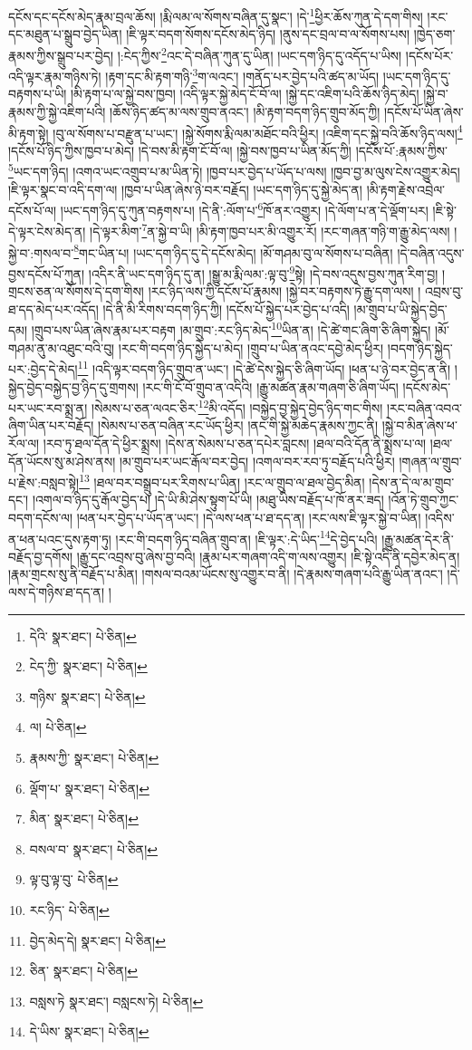 དངོས་དང་དངོས་མེད་རྣམ་བྲལ་ཆོས། །རྨི་ལམ་ལ་སོགས་བཞིན་དུ་སྣང་། །དེ་\footnote{དེའི་  སྣར་ཐང་།  པེ་ཅིན། }ཕྱིར་ཆོས་ཀུན་དེ་དག་གིས། །རང་དང་མཐུན་པ་སྒྲུབ་བྱེད་ཡིན། །ཇི་ལྟར་བདག་སོགས་དངོས་མེད་ཉིད། །ནུས་དང་བྲལ་བ་ལ་སོགས་པས། །ཁྱེད་ཅག་རྣམས་ཀྱིས་སྒྲུབ་པར་བྱེད། །:ངེད་ཀྱིས་\footnote{ངེད་ཀྱི་  སྣར་ཐང་།  པེ་ཅིན། }འང་དེ་བཞིན་ཀུན་དུ་ཡིན། །ཡང་དག་ཉིད་དུ་འདོད་པ་ཡིས། །དངོས་པོར་འདི་ལྟར་རྣམ་གཉིས་ཏེ། །རྟག་དང་མི་རྟག་གཉི་\footnote{གཉིས་  སྣར་ཐང་།  པེ་ཅིན། }ག་ལའང་། །གནོད་པར་བྱེད་པའི་ཚད་མ་ཡོད། །ཡང་དག་ཉིད་དུ་བརྟགས་པ་ཡི། །མི་རྟག་པ་ལ་སྐྱེ་བས་ཁྱབ། །འདི་ལྟར་སྐྱེ་མེད་ངོ་བོ་ལ། །སྐྱེ་དང་འཇིག་པའི་ཆོས་ཉིད་མེད། །སྐྱེ་བ་རྣམས་ཀྱི་སྐྱེ་འཇིག་པའི། །ཆོས་ཉིད་ཚད་མ་ལས་གྲུབ་ནའང་། །མི་རྟག་བདག་ཉིད་གྲུབ་མོད་ཀྱི། །དངོས་པོ་ཡིན་ཞེས་མི་རྟག་སྟེ། །བུ་ལ་སོགས་པ་བརྫུན་པ་ཡང་། །སྐྱེ་སོགས་རྨི་ལམ་མཐོང་བའི་ཕྱིར། །འཇིག་དང་སྐྱེ་བའི་ཆོས་ཉིད་ལས།\footnote{ལ།  པེ་ཅིན། } །དངོས་པོ་ཉིད་ཀྱིས་ཁྱབ་པ་མེད། །དེ་བས་མི་རྟག་ངོ་བོ་ལ། །སྐྱེ་བས་ཁྱབ་པ་ཡིན་མོད་ཀྱི། །དངོས་པོ་:རྣམས་ཀྱིས་\footnote{རྣམས་ཀྱི་  སྣར་ཐང་།  པེ་ཅིན། }ཡང་དག་ཉིད། །འགའ་ཡང་འགྲུབ་པ་མ་ཡིན་ཏེ། །ཁྱབ་པར་བྱེད་པ་ཡོད་པ་ལས། །ཁྱབ་བྱ་མ་ལུས་ངེས་འགྱུར་མེད། །ཇི་ལྟར་སྣང་བ་འདི་དག་ལ། །ཁྱབ་པ་ཡིན་ཞེས་ཉེ་བར་བརྗོད། །ཡང་དག་ཉིད་དུ་སྐྱེ་མེད་ན། །མི་རྟག་རྗེས་འབྲེལ་དངོས་པོ་ལ། །ཡང་དག་ཉིད་དུ་ཀུན་བརྟགས་པ། །དེ་ནི་:ལོག་པ་\footnote{ལྡོག་པ་  སྣར་ཐང་།  པེ་ཅིན། }ཁོ་ནར་འགྱུར། །དེ་ལོག་པ་ན་དེ་ལྡོག་པར། །ཇི་སྟེ་དེ་ལྟར་ངེས་མེད་ན། །དེ་ལྟར་མིག་\footnote{མིན་  སྣར་ཐང་།  པེ་ཅིན། }ན་སྐྱེ་བ་ཡི། །མི་རྟག་ཁྱབ་པར་མི་འགྱུར་རོ། །རང་གཞན་གཉི་ག་རྒྱུ་མེད་ལས། །སྐྱེ་བ་:གསལ་བ་\footnote{བསལ་བ་  སྣར་ཐང་།  པེ་ཅིན། }གང་ཡིན་པ། །ཡང་དག་ཉིད་དུ་དེ་དངོས་མེད། །མོ་གཤམ་བུ་ལ་སོགས་པ་བཞིན། །དེ་བཞིན་འདུས་བྱས་དངོས་པོ་ཀུན། །འདིར་ནི་ཡང་དག་ཉིད་དུ་ན། །སྒྱུ་མ་རྨི་ལམ་:ལྟ་བུ་\footnote{ལྟ་བུ་ལྟ་བུ་  པེ་ཅིན། }སྟེ། །དེ་བས་འདུས་བྱས་ཀུན་རིག་བྱ། །གྲངས་ཅན་ལ་སོགས་དེ་དག་གིས། །རང་ཉིད་ལས་ཀྱི་དངོས་པོ་རྣམས། །སྐྱེ་བར་བརྟགས་ཏེ་རྒྱུ་དག་ལས། །
འབྲས་བུ་ཐ་དད་མེད་པར་འདོད། །དེ་ནི་མི་རིགས་བདག་ཉིད་ཀྱི། །དངོས་པོ་སྐྱེད་པར་བྱེད་པ་འདི། །མ་གྲུབ་པ་ཡི་སྐྱེད་བྱེད་དམ། །གྲུབ་པས་ཡིན་ཞེས་རྣམ་པར་བརྟག །མ་གྲུབ་:རང་ཉིད་མེད་\footnote{རང་ཉིད་  པེ་ཅིན། }ཡིན་ན། །དེ་ཚེ་གང་ཞིག་ཅི་ཞིག་སྐྱེད། །མོ་གཤམ་ནུ་མ་འཐུང་བའི་བུ། །རང་གི་བདག་ཉིད་སྐྱེད་པ་མེད། །གྲུབ་པ་ཡིན་ནའང་དབྱེ་མེད་ཕྱིར། །བདག་ཉིད་སྐྱེད་པར་:བྱེད་དེ་མེད།\footnote{བྱེད་མེད་དེ།  སྣར་ཐང་།  པེ་ཅིན། } །འདི་ལྟར་བདག་ཉིད་གྲུབ་ན་ཡང་། །དེ་ཚེ་དེས་སྐྱེད་ཅི་ཞིག་ཡོད། །ཕན་པ་ཉེ་བར་བྱེད་ན་ནི། །སྐྱེད་བྱེད་བསྐྱེད་བྱ་ཉིད་དུ་གྲགས། །རང་གི་ངོ་བོ་གྲུབ་ན་འདིའི། །རྒྱུ་མཚན་རྣམ་གཞག་ཅི་ཞིག་ཡོད། །དངོས་མེད་པར་ཡང་རབ་སྨྲ་ན། །སེམས་པ་ཅན་ལའང་ཅིར་\footnote{ཅིན་  སྣར་ཐང་།  པེ་ཅིན། }མི་འདོད། །བསྐྱེད་བྱ་སྐྱེད་བྱེད་ཉིད་གང་གིས། །རང་བཞིན་འབའ་ཞིག་ཡིན་པར་བརྗོད། །སེམས་པ་ཅན་བཞིན་རང་ཡོད་ཕྱིར། །ནང་གི་སྐྱེ་མཆེད་རྣམས་ཀྱང་ནི། །སྐྱེ་བ་མིན་ཞེས་ཕ་རོལ་ལ། །རབ་ཏུ་ཐལ་དོན་དེ་ཕྱིར་སྨྲས། །དེས་ན་སེམས་པ་ཅན་དཔེར་བླངས། །ཐལ་བའི་དོན་ནི་སྨྲས་པ་ལ། །ཐལ་དོན་ཡོངས་སུ་མ་ཤེས་ནས། །མ་གྲུབ་པར་ཡང་རྒོལ་བར་བྱེད། །འགལ་བར་རབ་ཏུ་བརྗོད་པའི་ཕྱིར། །གཞན་ལ་གྲུབ་པ་རྗེས་:བསླབ་སྟེ།\footnote{བསླས་ཏེ  སྣར་ཐང་། བསླངས་ཏེ།  པེ་ཅིན། } །ཐལ་བར་བསྒྲུབ་པར་རིགས་པ་ཡིན། །རང་ལ་གྲུབ་ལ་ཐལ་བྱེད་མིན། །དེས་ན་དེ་ལ་མ་གྲུབ་དང་། །འགལ་བ་ཉིད་དུ་རྒོལ་བྱེད་པ། །དེ་ཡི་མི་ཤེས་སྟུག་པོ་ཡི། །མཐུ་ཡིས་བརྗོད་པ་ཁོ་ནར་ཟད། །འོན་ཏེ་གྲུབ་ཀྱང་བདག་དངོས་ལ། །ཕན་པར་བྱེད་པ་ཡོད་ན་ཡང་། །དེ་ལས་ཕན་པ་ཐ་དད་ན། །རང་ལས་ཇི་ལྟར་སྐྱེ་བ་ཡིན། །འདིས་ན་ཕན་པའང་དུས་རྟག་ཏུ། །རང་གི་བདག་ཉིད་བཞིན་གྲུབ་ན། །ཇི་ལྟར་:དེ་ཡིད་\footnote{དེ་ཡིས་  སྣར་ཐང་།  པེ་ཅིན། }དེ་བྱེད་པའི། །རྒྱུ་མཚན་དེར་ནི་བརྗོད་བྱ་དགོས། །རྒྱུ་དང་འབྲས་བུ་ཞེས་བྱ་བའི། །རྣམ་པར་གཞག་འདི་ག་ལས་འགྱུར། །ཇི་སྟེ་འདི་ནི་དབྱེར་མེད་ན། །རྣམ་གྲངས་སུ་ནི་བརྗོད་པ་མིན། །གསལ་བའམ་ཡོངས་སུ་འགྱུར་བ་ནི། །དེ་རྣམས་གཞག་པའི་རྒྱུ་ཡིན་ནའང་། །དེ་ལས་དེ་གཉིས་ཐ་དད་ན། །

